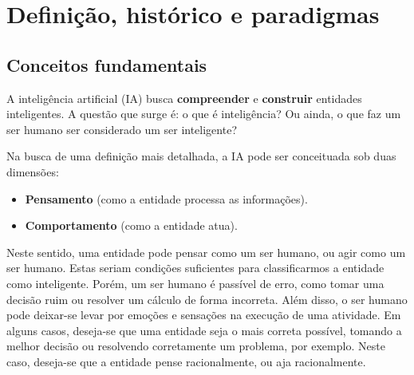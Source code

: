 \chapter{Definição, histórico e paradigmas}
\label{cap:introducao}


\section{Conceitos fundamentais}

A inteligência artificial (IA) busca \textbf{compreender} e \textbf{construir} entidades inteligentes. A questão que surge é: o que é inteligência? Ou ainda, o que faz um ser humano ser considerado um ser inteligente?
	
Na busca de uma definição mais detalhada, a IA pode ser conceituada sob duas dimensões:
\begin{itemize}
	\item \textbf{Pensamento} (como a entidade processa as informações).
	\item \textbf{Comportamento} (como a entidade atua).
\end{itemize}

Neste sentido, uma entidade pode pensar como um ser humano, ou agir como um ser humano. Estas seriam condições suficientes para classificarmos a entidade como inteligente. Porém, um ser humano é passível de erro, como tomar uma decisão ruim ou resolver um cálculo de forma incorreta. Além disso, o ser humano pode deixar-se levar por emoções e sensações na execução de uma atividade. Em alguns casos, deseja-se que uma entidade seja o mais correta possível, tomando a melhor decisão ou resolvendo corretamente um problema, por exemplo. Neste caso, deseja-se que a entidade pense racionalmente, ou aja racionalmente.

